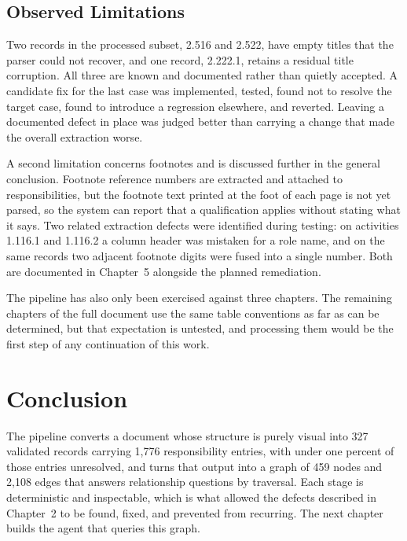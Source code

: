 \subsection{Observed Limitations}

Two records in the processed subset, 2.516 and 2.522, have empty titles that the parser could not recover, and one record, 2.222.1, retains a residual title corruption. All three are known and documented rather than quietly accepted. A candidate fix for the last case was implemented, tested, found not to resolve the target case, found to introduce a regression elsewhere, and reverted. Leaving a documented defect in place was judged better than carrying a change that made the overall extraction worse.

A second limitation concerns footnotes and is discussed further in the general conclusion. Footnote reference numbers are extracted and attached to responsibilities, but the footnote text printed at the foot of each page is not yet parsed, so the system can report that a qualification applies without stating what it says. Two related extraction defects were identified during testing: on activities 1.116.1 and 1.116.2 a column header was mistaken for a role name, and on the same records two adjacent footnote digits were fused into a single number. Both are documented in Chapter~5 alongside the planned remediation.

The pipeline has also only been exercised against three chapters. The remaining chapters of the full document use the same table conventions as far as can be determined, but that expectation is untested, and processing them would be the first step of any continuation of this work.

\section*{Conclusion}

The pipeline converts a document whose structure is purely visual into 327 validated records carrying 1,776 responsibility entries, with under one percent of those entries unresolved, and turns that output into a graph of 459 nodes and 2,108 edges that answers relationship questions by traversal. Each stage is deterministic and inspectable, which is what allowed the defects described in Chapter~2 to be found, fixed, and prevented from recurring. The next chapter builds the agent that queries this graph.
